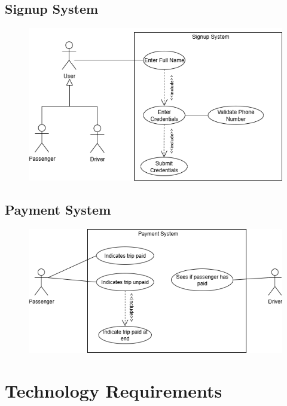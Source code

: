 \documentclass[a4paper,12pt]{article}
\begin{document}
  \subsection*{Signup System}
    \begin{figure}[H]
      \centering
      \includegraphics[width=1\textwidth]{Signup System.png} 
    \end{figure}
  \subsection*{Payment System}
    \begin{figure}[H]
      \centering
      \includegraphics[width=1\textwidth]{Payment System.png} 
    \end{figure}

\section{Technology Requirements}
\end{document}
